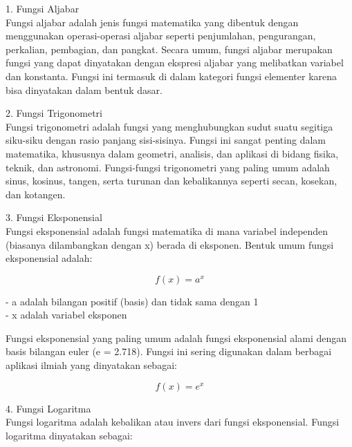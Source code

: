 \documentclass[a4paper,10pt]{article}
\begin{document}
\begin{eulernotebook}
\begin{eulercomment}
\begin{eulercomment}
\begin{eulercomment}
\begin{eulercomment}
\begin{eulercomment}
\begin{eulercomment}
\begin{eulercomment}
\begin{eulercomment}
\begin{eulercomment}
\begin{eulercomment}
\begin{eulercomment}
\begin{eulercomment}
\begin{eulercomment}
\begin{eulercomment}
\begin{eulercomment}
\begin{eulercomment}
\begin{eulercomment}
\end{eulercomment}
\begin{eulercomment}
1. Fungsi Aljabar\\
Fungsi aljabar adalah jenis fungsi matematika yang dibentuk dengan
menggunakan operasi-operasi aljabar seperti penjumlahan, pengurangan,
perkalian, pembagian, dan pangkat. Secara umum, fungsi aljabar
merupakan fungsi yang dapat dinyatakan dengan ekspresi aljabar yang
melibatkan variabel dan konstanta. Fungsi ini termasuk di dalam
kategori fungsi elementer karena bisa dinyatakan dalam bentuk dasar.

2. Fungsi Trigonometri\\
Fungsi trigonometri adalah fungsi yang menghubungkan sudut suatu
segitiga siku-siku dengan rasio panjang sisi-sisinya. Fungsi ini
sangat penting dalam matematika, khususnya dalam geometri, analisis,
dan aplikasi di bidang fisika, teknik, dan astronomi. Fungsi-fungsi
trigonometri yang paling umum adalah sinus, kosinus, tangen, serta
turunan dan kebalikannya seperti secan, kosekan, dan kotangen.

3. Fungsi Eksponensial\\
Fungsi eksponensial adalah fungsi matematika di mana variabel
independen (biasanya dilambangkan dengan x) berada di eksponen. Bentuk
umum fungsi eksponensial adalah:

\end{eulercomment}
\begin{eulerformula}
\[
f(x)=a^x
\]
\end{eulerformula}
\begin{eulercomment}
- a adalah bilangan positif (basis) dan tidak sama dengan 1\\
- x adalah variabel eksponen

Fungsi eksponensial yang paling umum adalah fungsi eksponensial alami
dengan basis bilangan euler (e = 2.718). Fungsi ini sering digunakan
dalam berbagai aplikasi ilmiah yang dinyatakan sebagai:

\end{eulercomment}
\begin{eulerformula}
\[
f(x)=e^x
\]
\end{eulerformula}
\begin{eulercomment}
4. Fungsi Logaritma\\
Fungsi logaritma adalah kebalikan atau invers dari fungsi
eksponensial. Fungsi logaritma dinyatakan sebagai:


\end{eulercomment}
\end{eulercomment}
\end{eulercomment}
\end{eulercomment}
\end{eulercomment}
\end{eulercomment}
\end{eulercomment}
\end{eulercomment}
\end{eulercomment}
\end{eulercomment}
\end{eulercomment}
\end{eulercomment}
\end{eulercomment}
\end{eulercomment}
\end{eulercomment}
\end{eulercomment}
\end{eulercomment}
\end{eulernotebook}
\end{document}
